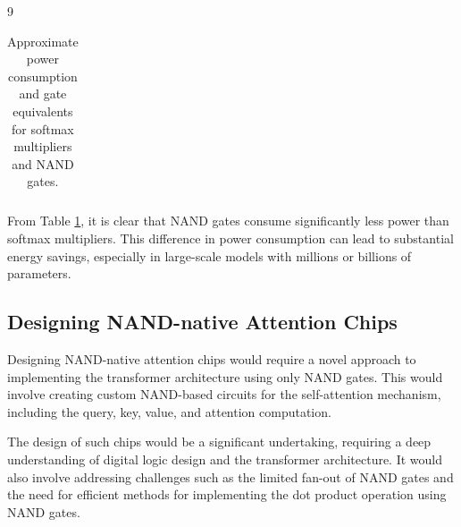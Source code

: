 \documentclass[11pt]{article}
\theoremstyle{definition}
\begin{document}
\begin{thebibliography}{9}
\begin{table}[h]
\begin{tabular}{|l|l|l|}
\end{tabular}






\caption{Approximate power consumption and gate equivalents for softmax multipliers and NAND gates.}






\label{tab:power-comparison}






\end{table}













From Table \ref{tab:power-comparison}, it is clear that NAND gates consume significantly less power than softmax multipliers. This difference in power consumption can lead to substantial energy savings, especially in large-scale models with millions or billions of parameters.













\subsection{Designing NAND-native Attention Chips}













Designing NAND-native attention chips would require a novel approach to implementing the transformer architecture using only NAND gates. This would involve creating custom NAND-based circuits for the self-attention mechanism, including the query, key, value, and attention computation.













The design of such chips would be a significant undertaking, requiring a deep understanding of digital logic design and the transformer architecture. It would also involve addressing challenges such as the limited fan-out of NAND gates and the need for efficient methods for implementing the dot product operation using NAND gates.














\end{thebibliography}
\end{document}
